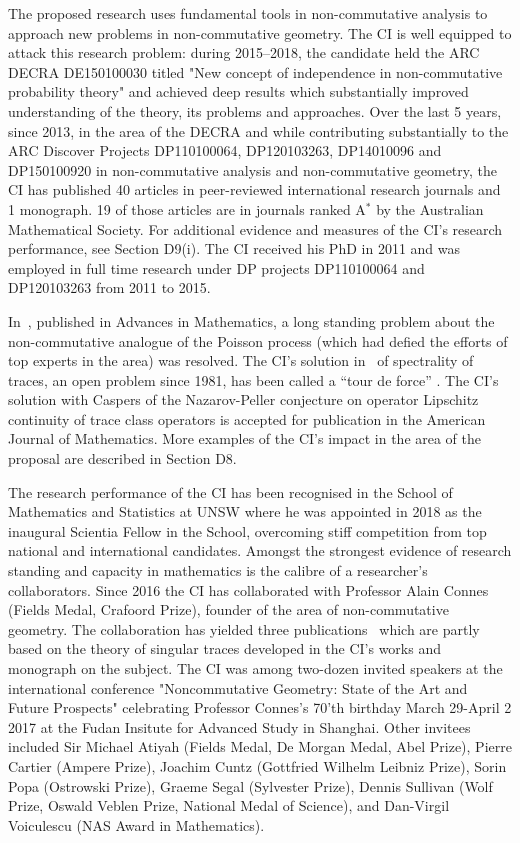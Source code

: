 \documentclass[12pt]{article}
\newcommand{\archeading}[1]{\vspace{.3cm} \noindent{\bfseries #1} \vspace{.1cm}   }
\begin{document}
\bigskip\archeading{Future Fellowship Candidate}

The proposed research uses fundamental tools in non-commutative analysis to approach new problems in non-commutative geometry. The CI is well equipped to attack this research problem: during 2015--2018, the candidate held the ARC DECRA DE150100030 titled "New concept of independence in non-commutative probability theory" and achieved deep results which substantially improved understanding of the theory, its problems and approaches. Over the last 5 years, since 2013, in the area of the DECRA and while contributing substantially to the ARC Discover Projects DP110100064, DP120103263, DP14010096 and DP150100920 in non-commutative analysis and non-commutative geometry, the CI has published 40 articles in peer-reviewed international research journals and 1 monograph. 19 of those articles are in journals ranked A$^{\ast}$ by the Australian Mathematical Society. For additional evidence and measures of the CI's research performance, see Section D9(i). The CI received his PhD in 2011 and was employed in full time research under DP projects DP110100064 and DP120103263 from 2011 to 2015.

In~\cite{JSZ_advances}, published in Advances in Mathematics, a long standing problem about the non-commutative analogue of the Poisson process (which had defied the efforts of top experts in the area) was resolved. The CI's solution in~\cite{SZspectral} of spectrality of traces, an open problem since 1981, has been called a ``tour de force'' \cite[p.~149]{LoreauxWeiss2018}. The CI's solution with Caspers of the Nazarov-Peller conjecture on operator Lipschitz continuity of trace class operators is accepted for publication in the American Journal of Mathematics. More examples of the CI's impact in the area of the proposal are described in Section D8.

The research performance of the CI has been recognised in the School of Mathematics and Statistics at UNSW where he was appointed in 2018 as the inaugural Scientia Fellow in the School, overcoming stiff competition from top national and international candidates.
Amongst the strongest evidence of research standing and capacity in mathematics is the calibre of a researcher's collaborators.
Since 2016 the CI has collaborated with Professor Alain Connes (Fields Medal, Crafoord Prize), founder of the area of non-commutative geometry. The collaboration has yielded three publications~\cite{Connes_team,Connes_team_symmetric} which are partly based on the theory of singular traces developed in the CI's works and monograph \cite{book} on the subject. The CI was among two-dozen invited speakers at the international conference "Noncommutative
Geometry: State of the Art and Future Prospects" celebrating Professor Connes's 70'th birthday March 29-April
2 2017 at the Fudan Insitute for Advanced Study in Shanghai. Other invitees included
Sir Michael Atiyah (Fields Medal, De Morgan Medal, Abel Prize), Pierre Cartier (Ampere Prize), Joachim Cuntz (Gottfried Wilhelm Leibniz Prize), Sorin Popa (Ostrowski
Prize), Graeme Segal (Sylvester Prize), Dennis Sullivan (Wolf Prize, Oswald Veblen Prize, National
Medal of Science), and Dan-Virgil Voiculescu (NAS Award in Mathematics).
\end{document}
